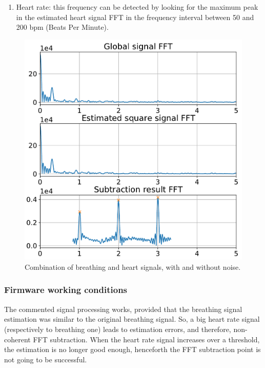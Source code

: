 \documentclass[twoside, twocolumn, spanish] {article}
\begin{document}
\begin{enumerate}
\item Heart rate: this frequency can be detected by looking for the maximum peak in the estimated heart signal FFT in the frequency interval between 50 and 200 bpm (Beats Per Minute).
\end{enumerate}

\begin{figure}[!h]
\centering
\includegraphics[width=\columnwidth]{imag/proc7}
\caption{Combination of breathing and heart signals, with and without noise.}  \label{heart_rate}
\end{figure}

%


\subsubsection*{Firmware working conditions}
The commented signal processing works, provided that the breathing signal estimation was similar to the original breathing signal. So, a big heart rate signal (respectively to breathing one) leads to estimation errors, and therefore, non-coherent FFT subtraction. When the heart rate signal increases over a threshold, the estimation is no longer good enough, henceforth the FFT subtraction point is not going to be successful.



\clearpage
\end{document}
